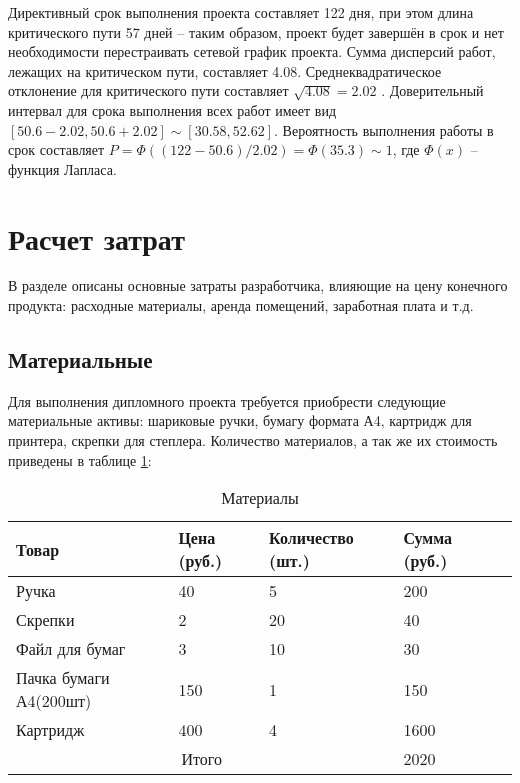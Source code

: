 Директивный срок выполнения проекта составляет 122 дня, при этом длина критического пути 57 дней – таким образом, проект будет завершён в срок и нет необходимости перестраивать сетевой график проекта. Сумма дисперсий работ, лежащих на критическом пути, составляет 4.08. Среднеквад\-ратическое отклонение для критического пути составляет $\sqrt{4.08} = 2.02$ . Доверительный интервал для срока выполнения всех работ имеет вид $[50.6-2.02,50.6+2.02 ] \sim [30.58, 52.62]$. Вероятность выполнения работы в срок составляет $P=\Phi((122-50.6)/2.02)=\Phi(35.3)\sim 1$, где $\Phi(x)$ – функция Лапласа.

\section{Расчет затрат}
\label{rz}

В разделе описаны основные затраты разработчика, влияющие на це\-ну конечного продукта: расходные материалы, аренда помещений, зара\-ботная плата и т.д.

\subsection{Материальные}

Для выполнения дипломного проекта требуется приобрести следующие материальные активы: шариковые ручки, бумагу формата А4, картридж для принтера, скрепки для степлера. Количество материалов, а так же их стоимость приведены в таблице \ref{materials}:

\begin{table}[H]
\caption{Материалы \label{materials}}
\begin{center}
\begin{tabular}{|p{3.5cm}|p{3.6cm}|p{3.6cm}|p{3.4cm}|p{3.4cm}|}
\hline
Товар & Цена (руб.) & Количество (шт.) & Сумма (руб.)\\
\hline
Ручка &40 &5 &200\\
\hline
Скрепки &2 &20 &40 \\
\hline
Файл для бумаг &3 &10 &30\\
\hline
Пачка бумаги А4(200шт) &150 &1  &150\\
\hline
Картридж &400 &4 &1600\\
\hline
\multicolumn{3}{|c|}{Итого}& 2020 \\
\hline
\end{tabular}
\end{center}
\end{table}

